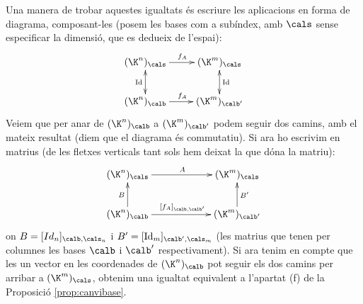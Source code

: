 Una manera de trobar aquestes igualtats és escriure les aplicacions en forma de diagrama, composant-les (posem les bases com a subíndex, amb $\cals$ sense especificar la dimensió, que es dedueix de l'espai):
$$
\xymatrix{
(\K^n)_\cals \ar[r]^{f_A} \ar@{<->}[d]_\Id & (\K^m)_\cals \ar@{<->}[d]^\Id \\
(\K^n)_\calb \ar[r]^{f_A} & (\K^m)_{\calb'}}
$$
Veiem que per anar de $(\K^n)_\calb$ a $(\K^m)_{\calb'}$ podem seguir dos camins, amb el mateix resultat (diem que el diagrama és commutatiu). Si ara ho escrivim en matrius (de les fletxes verticals tant sols hem deixat la que dóna la matriu):
$$\xymatrixcolsep{6em}
\xymatrix{
(\K^n)_\cals \ar[r]^{A}  &  (\K^m)_\cals  \\
(\K^n)_\calb \ar[r]^{[f_A]_{\calb,\calb'}} \ar[u]^B & (\K^m)_{\calb'} \ar[u]_{B'}}
$$
on $B=[Id_n]_{\calb,\cals_n}$ i $B'=[\Id_m]_{\calb',\cals_m}$ (les matrius que tenen per columnes les bases $\calb$ i $\calb'$ respectivament). Si ara tenim en compte que les un vector en les coordenades de $(\K^n)_\calb$ pot seguir els dos camins per arribar a $(\K^m)_{\cals}$, obtenim una igualtat equivalent a l'apartat (f) de la Proposició \ref{prop:canvibase}.

